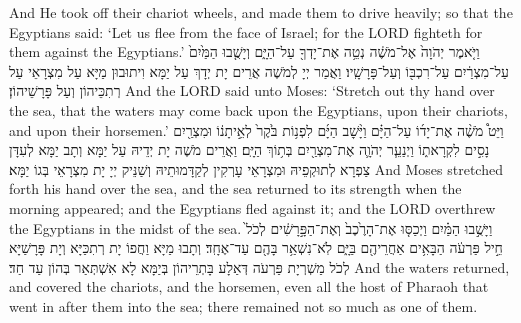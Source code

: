 {{And He took off their chariot wheels, and made them to drive heavily; so that the Egyptians said: ‘Let us flee from the face of Israel; for the LORD fighteth for them against the Egyptians.’}{}
{וַיֹּ֤אמֶר יְהֹוָה֙ אֶל־מֹשֶׁ֔ה נְטֵ֥ה אֶת־יָדְךָ֖ עַל־הַיָּ֑ם וְיָשֻׁ֤בוּ הַמַּ֙יִם֙ עַל־מִצְרַ֔יִם עַל־רִכְבּ֖וֹ וְעַל־פָּרָשָֽׁיו׃
}
{וַאֲמַר יְיָ לְמֹשֶׁה אֲרֵים יָת יְדָךְ עַל יַמָּא וִיתוּבוּן מַיָּא עַל מִצְרָאֵי עַל רְתִכֵּיהוֹן וְעַל פָּרָשֵׁיהוֹן׃}
{And the LORD said unto Moses: ‘Stretch out thy hand over the sea, that the waters may come back upon the Egyptians, upon their chariots, and upon their horsemen.’}{}
{וַיֵּט֩ מֹשֶׁ֨ה אֶת־יָד֜וֹ עַל־הַיָּ֗ם וַיָּ֨שׇׁב הַיָּ֜ם לִפְנ֥וֹת בֹּ֙קֶר֙ לְאֵ֣יתָנ֔וֹ וּמִצְרַ֖יִם נָסִ֣ים לִקְרָאת֑וֹ וַיְנַעֵ֧ר יְהֹוָ֛ה אֶת־מִצְרַ֖יִם בְּת֥וֹךְ הַיָּֽם׃
}
{וַאֲרֵים מֹשֶׁה יָת יְדֵיהּ עַל יַמָּא וְתָב יַמָּא לְעִדָּן צַפְרָא לְתוּקְפֵיהּ וּמִצְרָאֵי עָרְקִין לְקַדָּמוּתֵיהּ וְשַׁנֵּיק יְיָ יָת מִצְרָאֵי בְּגוֹ יַמָּא׃}
{And Moses stretched forth his hand over the sea, and the sea returned to its strength when the morning appeared; and the Egyptians fled against it; and the LORD overthrew the Egyptians in the midst of the sea.}{}
{וַיָּשֻׁ֣בוּ הַמַּ֗יִם וַיְכַסּ֤וּ אֶת־הָרֶ֙כֶב֙ וְאֶת־הַפָּ֣רָשִׁ֔ים לְכֹל֙ חֵ֣יל פַּרְעֹ֔ה הַבָּאִ֥ים אַחֲרֵיהֶ֖ם בַּיָּ֑ם לֹֽא־נִשְׁאַ֥ר בָּהֶ֖ם עַד־אֶחָֽד׃
}
{וְתָבוּ מַיָּא וַחֲפוֹ יָת רְתִכַּיָּא וְיָת פָּרָשַׁיָּא לְכֹל מַשְׁרְיָת פַּרְעֹה דְּאַלָע בָּתְרֵיהוֹן בְּיַמָּא לָא אִשְׁתְּאַר בְּהוֹן עַד חַד׃}
{And the waters returned, and covered the chariots, and the horsemen, even all the host of Pharaoh that went in after them into the sea; there remained not so much as one of them.}{}
}
